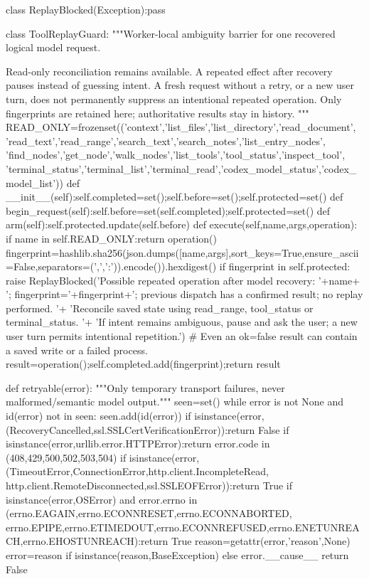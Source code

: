 class ReplayBlocked(Exception):pass

class ToolReplayGuard:
    """Worker-local ambiguity barrier for one recovered logical model request.

    Read-only reconciliation remains available. A repeated effect after recovery
    pauses instead of guessing intent. A fresh request without a retry, or a new
    user turn, does not permanently suppress an intentional repeated operation.
    Only fingerprints are retained here; authoritative results stay in history.
    """
    READ_ONLY=frozenset(('context','list_files','list_directory','read_document',
        'read_text','read_range','search_text','search_notes','list_entry_nodes',
        'find_nodes','get_node','walk_nodes','list_tools','tool_status','inspect_tool',
        'terminal_status','terminal_list','terminal_read','codex_model_status','codex_model_list'))
    def __init__(self):self.completed=set();self.before=set();self.protected=set()
    def begin_request(self):self.before=set(self.completed);self.protected=set()
    def arm(self):self.protected.update(self.before)
    def execute(self,name,args,operation):
        if name in self.READ_ONLY:return operation()
        fingerprint=hashlib.sha256(json.dumps([name,args],sort_keys=True,ensure_ascii=False,separators=(',',':')).encode()).hexdigest()
        if fingerprint in self.protected:
            raise ReplayBlocked('Possible repeated operation after model recovery: '+name+
                '; fingerprint='+fingerprint+'; previous dispatch has a confirmed result; no replay performed. '+
                'Reconcile saved state using read_range, tool_status or terminal_status. '+
                'If intent remains ambiguous, pause and ask the user; a new user turn permits intentional repetition.')
        # Even an ok=false result can contain a saved write or a failed process.
        result=operation();self.completed.add(fingerprint);return result


def retryable(error):
    """Only temporary transport failures, never malformed/semantic model output."""
    seen=set()
    while error is not None and id(error) not in seen:
        seen.add(id(error))
        if isinstance(error,(RecoveryCancelled,ssl.SSLCertVerificationError)):return False
        if isinstance(error,urllib.error.HTTPError):return error.code in (408,429,500,502,503,504)
        if isinstance(error,(TimeoutError,ConnectionError,http.client.IncompleteRead,
                             http.client.RemoteDisconnected,ssl.SSLEOFError)):return True
        if isinstance(error,OSError) and error.errno in (errno.EAGAIN,errno.ECONNRESET,errno.ECONNABORTED,
                errno.EPIPE,errno.ETIMEDOUT,errno.ECONNREFUSED,errno.ENETUNREACH,errno.EHOSTUNREACH):return True
        reason=getattr(error,'reason',None)
        error=reason if isinstance(reason,BaseException) else error.__cause__
    return False


